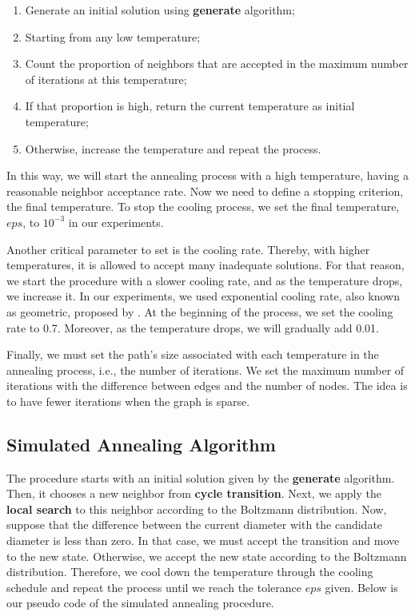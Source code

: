\documentclass[12pt]{article}
\begin{document}
    \begin{enumerate}
        \item Generate an initial solution using \textbf{generate} algorithm;
        \item Starting from any low temperature;
        \item Count the proportion of neighbors that are accepted in the maximum number of iterations at this temperature;
        \item If that proportion is high, return the current temperature as initial temperature;
        \item Otherwise, increase the temperature and repeat the process.
    \end{enumerate}
    
 In this way, we will start the annealing process with a high temperature, having a reasonable neighbor acceptance rate.   
Now we need to define a stopping criterion, the final temperature. To stop the cooling process, we set the final temperature, $eps$, to $10^{-3}$ in our experiments.

Another critical parameter to set is the cooling rate. Thereby, with higher temperatures, it is allowed to accept many inadequate solutions. For that reason, we start the procedure with a slower cooling rate, and as the temperature drops, we increase it. In our experiments, we used exponential cooling rate, also known as geometric, proposed by \cite{Kirkpatrick1983, Wilhelm1987}. At the beginning of the process, we set the cooling rate to 0.7. Moreover, as the temperature drops, we will gradually add 0.01. 

Finally, we must set the path's size associated with each temperature in the annealing process, i.e., the number of iterations. We set the maximum number of iterations with the difference between edges and the number of nodes. The idea is to have fewer iterations when the graph is sparse.

\subsection{Simulated Annealing Algorithm}

The procedure starts with an initial solution given by the \textbf{generate} algorithm. Then, it chooses a new neighbor from \textbf{cycle transition}. Next, we apply the \textbf{local search} to this neighbor according to the Boltzmann distribution. Now, suppose that the difference between the current diameter with the candidate diameter is less than zero. In that case, we must accept the transition and move to the new state. Otherwise, we accept the new state according to the Boltzmann distribution. Therefore, we cool down the temperature through the cooling schedule and repeat the process until we reach the tolerance $eps$ given. Below is our pseudo code of the simulated annealing procedure.
    
\end{document}

